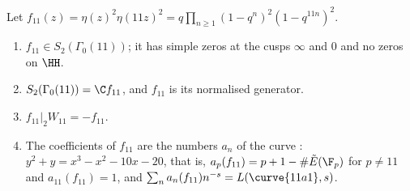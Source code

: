 \begin{theorem}[$S_2(\Gamma_0(11))$]\label{thm:modforms:level-eleven}
Let $f_{11}(z)=\eta(z)^2\eta(11z)^2=q\prod_{n\ge1}(1-q^n)^2(1-q^{11n})^2$.
\begin{enumerate}[label=(\roman*)]
\item $f_{11}\in S_2(\Gamma_0(11))$; it has simple zeros at the cusps $\infty$ and $0$ and no zeros on $\HH$.
\item $S_2(\Gamma_0(11))=\C f_{11}$, and $f_{11}$ is its normalised generator.
\item $f_{11}|_2W_{11}=-f_{11}$.
\item The coefficients of $f_{11}$ are the numbers $a_n$ of the curve : $y^2+y=x^3-x^2-10x-20$, that is, $a_p(f_{11})=p+1-\#\tilde E(\F_p)$ for $p\ne11$ and
$a_{11}(f_{11})=1$, and $\sum_na_n(f_{11})n^{-s}=L(\curve{11a1},s)$.
\end{enumerate}
\end{theorem}

